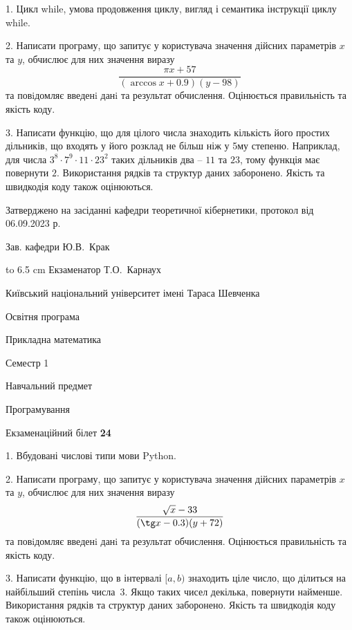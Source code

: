 \documentclass[12pt, ukrainian]{article}
\begin{document}
{%
1. Цикл while, умова продовження циклу, вигляд і семантика інструкції циклу while.%
\par
2. Написати програму, що запитує у користувача значення дійсних параметрів $x$ та $y$, обчислює для них значення виразу 
$$\frac{\pi x + 57}{(\arccos x + 0.9) (y - 98)}$$ 
та повiдомляє введенi данi та результат обчислення.
 Оцінюється правильність та якість коду.

\par
3. Написати функцію, що для цілого числа знаходить кількість його простих дільників, що входять у його розклад не більш ніж у 5му степеню. Наприклад, для числа $3^8{\cdot}7^9{\cdot}11{\cdot}23^{2}$ таких дільників два – $11$ та $23$, тому функція має повернути $2$.  Використання рядків та структур даних заборонено. Якість та швидкодія коду також оцінюються. 

}
{\smallskip\smallskip \begin {scriptsize} Затверджено на засіданні кафедри теоретичної кібернетики, протокол   від   06.09.2023 р.\par\smallskip\smallskip\smallskip\smallskip
{\parbox {6.5 cm} {Зав. кафедри \dotfill Ю.В.~Крак}}\hspace {0.7cm} {\hbox to 6.5 cm { Екзаменатор \dotfill Т.О.~Карнаух}} \end{scriptsize}}
\vspace{0.9cm}
{{\begin {scriptsize}\par
{ \center  Київський національний університет імені Тараса Шевченка \par}
{\parbox {5 cm}{Освітня програма \hfill}{\parbox {7 cm}{Прикладна математика\hfill}}\parbox {6 cm}{\hfill Семестр 1}}\par
{\parbox {5 cm} {Навчальний предмет \hfill}\parbox {7 cm}{Програмування \hfill}\parbox {6cm}{\hfill}\par}\vspace{-15pt} \end{scriptsize}}{\center Екзаменаційний білет \No \textbf { 24 }\par}}
{%
1. Вбудовані числові типи мови Python.%
\par
2. Написати програму, що запитує у користувача значення дійсних параметрів $x$ та $y$, обчислює для них значення виразу 
$$\frac{\sqrt x - 33}{(\tg x - 0.3) (y + 72)}$$ 
та повiдомляє введенi данi та результат обчислення.
 Оцінюється правильність та якість коду.

\par
3. Написати функцію, що в інтервалі $[a, b)$ знаходить ціле число, що ділиться на найбільший степінь числа 3. Якщо таких чисел декілька, повернути найменше.  Використання рядків та структур даних заборонено. Якість та швидкодія коду також оцінюються. 

}
\end{document}
